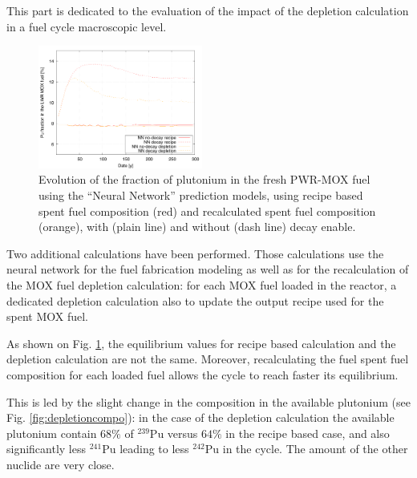 \documentclass{anstrans}
\begin{document}
This part is dedicated to the evaluation of the impact of the depletion
calculation in a fuel cycle macroscopic level.

\begin{figure}[ht] %
  \centering
  \includegraphics[width=0.48\textwidth]{irradiation_pu_contribution.png}
  \caption{Evolution of the fraction of plutonium in the fresh PWR-MOX fuel
    using the ``Neural Network'' prediction models, using recipe based spent
    fuel composition (red) and recalculated spent fuel composition (orange),
  with (plain line) and without (dash line) decay enable.} 
  \label{fig:depletion}
\end{figure}

Two additional calculations have been performed. Those calculations use the
neural network for the fuel fabrication modeling as well as for the
recalculation of the MOX fuel depletion calculation: for each MOX fuel loaded in
the reactor, a dedicated depletion calculation also to update the output recipe
used for the spent MOX fuel.


As shown on Fig. \ref{fig:depletion}, the equilibrium values for recipe based
calculation and the depletion calculation are not the same. Moreover,
recalculating the fuel spent fuel composition for each loaded fuel allows the
cycle to reach faster its equilibrium. 

This is led by the slight change in the composition in the available plutonium
(see Fig. \ref{fig:depletioncompo}): in the case of the depletion calculation
the available plutonium contain $68\%$ of $^{239}$Pu versus $64\%$ in the recipe
based case, and also significantly less $^{241}$Pu leading to less $^{242}$Pu in
the cycle. The amount of the other nuclide are very close.
\end{document}

